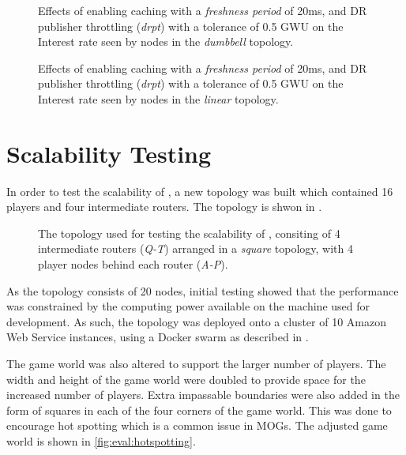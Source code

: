 \begin{figure}[H]
    \centering
    \caption{Effects of enabling caching with a \textit{freshness period} of 20ms, and DR publisher throttling (\textit{drpt}) with a tolerance of 0.5 GWU on the Interest rate seen by nodes in the \textit{dumbbell} topology.}
    \label{fig:eval:dr-pub-throt:dumbbell-interest-rates}
\end{figure}

\begin{figure}[H]
    \centering
    \caption{Effects of enabling caching with a \textit{freshness period} of 20ms, and DR publisher throttling (\textit{drpt}) with a tolerance of 0.5 GWU on the Interest rate seen by nodes in the \textit{linear} topology.}
    \label{fig:eval:dr-pub-throt:linear-interest-rates}
\end{figure}



\section{Scalability Testing}\label{sec:eval:scalability}
In order to test the scalability of \game{}, a new topology was built which contained 16 players and four intermediate routers. The topology is shwon in .

\begin{figure}[H]
    \centering
    \caption{The topology used for testing the scalability of \game{}, consiting of 4 intermediate routers (\textit{Q-T}) arranged in a \textit{square} topology, with 4 player nodes behind each router (\textit{A-P}).}
    \label{fig:eval:scalability-topology}
\end{figure}

As the topology consists of 20 nodes, initial testing showed that the performance was constrained by the computing power available on the machine used for development. As such, the topology was deployed onto a cluster of 10 Amazon Web Service instances, using a Docker swarm as described in .

The game world was also altered to support the larger number of players. The width and height of the game world were doubled to provide space for the increased number of players. Extra impassable boundaries were also added in the form of squares in each of the four corners of the game world. This was done to encourage hot spotting which is a common issue in MOGs. The adjusted game world is shown in \ref{fig:eval:hotspotting}.

